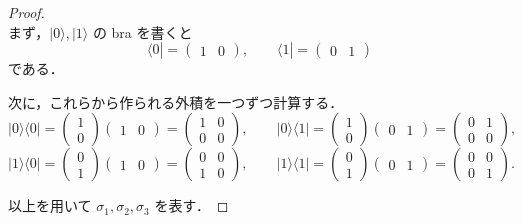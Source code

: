 \documentclass[dvipdfmx,a4paper]{jsarticle}
\theoremstyle{mystyle}
\begin{document}
\begin{proof}
\ \\
まず，$|0\rangle,|1\rangle$ の bra を書くと
\[
\langle 0|=
\begin{pmatrix}
1 & 0
\end{pmatrix},
\qquad
\langle 1|=
\begin{pmatrix}
0 & 1
\end{pmatrix}
\]
である．

\medskip
\noindent
次に，これらから作られる外積を一つずつ計算する．
\[
|0\rangle\langle 0|
=
\begin{pmatrix}
1\\
0
\end{pmatrix}
\begin{pmatrix}
1 & 0
\end{pmatrix}
=
\begin{pmatrix}
1 & 0\\
0 & 0
\end{pmatrix},
\qquad
|0\rangle\langle 1|
=
\begin{pmatrix}
1\\
0
\end{pmatrix}
\begin{pmatrix}
0 & 1
\end{pmatrix}
=
\begin{pmatrix}
0 & 1\\
0 & 0
\end{pmatrix},
\]
\[
|1\rangle\langle 0|
=
\begin{pmatrix}
0\\
1
\end{pmatrix}
\begin{pmatrix}
1 & 0
\end{pmatrix}
=
\begin{pmatrix}
0 & 0\\
1 & 0
\end{pmatrix},
\qquad
|1\rangle\langle 1|
=
\begin{pmatrix}
0\\
1
\end{pmatrix}
\begin{pmatrix}
0 & 1
\end{pmatrix}
=
\begin{pmatrix}
0 & 0\\
0 & 1
\end{pmatrix}.
\]

\medskip
\noindent
以上を用いて $\sigma_1,\sigma_2,\sigma_3$ を表す．


\end{proof}
\end{document}
